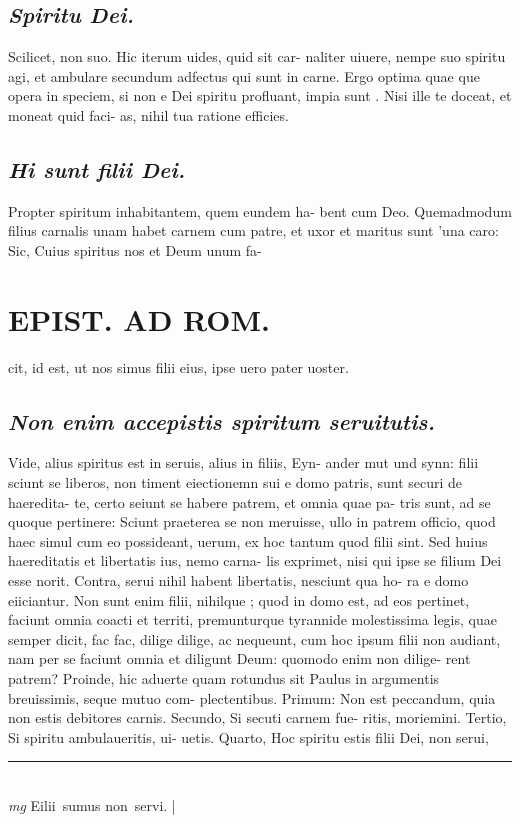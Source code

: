 \documentclass{article}
\begin{document}
\begin{pages}
\subsection*{\textit{Spiritu Dei. }}\pstart Scilicet, non suo. Hic iterum uides, quid sit car- naliter uiuere, nempe suo spiritu agi, et ambulare secundum adfectus qui sunt in carne. Ergo optima quae que opera in speciem, si non e Dei spiritu profluant, impia sunt . Nisi ille te doceat, et moneat quid faci- as, nihil tua ratione efficies.   \pend
{}
{}
\subsection*{\textit{Hi sunt filii Dei. }}\pstart Propter spiritum inhabitantem, quem eundem ha- bent cum Deo. Quemadmodum filius carnalis unam habet carnem cum patre, et uxor et maritus sunt 'una caro: Sic, Cuius spiritus nos et Deum unum fa-  \pend
\section*{EPIST. AD ROM.  }
\marginpar{[ p. ]}\pstart cit, id est, ut nos simus filii eius, ipse uero pater uoster.  \pend
{}
{}
\subsection*{\textit{Non enim accepistis spiritum seruitutis. }}\pstart Vide, alius spiritus est in seruis, alius in filiis, Eyn- ander mut und synn: filii sciunt se liberos, non timent eiectionemn sui e domo patris, sunt securi de haeredita- te, certo seiunt se habere patrem, et omnia quae pa- tris sunt, ad se quoque pertinere: Sciunt praeterea se non meruisse, ullo in patrem officio, quod haec simul cum eo possideant, uerum, ex hoc tantum quod filii sint.  Sed huius haereditatis et libertatis ius, nemo carna- lis exprimet, nisi qui ipse se filium Dei esse norit.  Contra, serui nihil habent libertatis, nesciunt qua ho- ra e domo eiiciantur. Non sunt enim filii, nihilque ; quod in domo est, ad eos pertinet, faciunt omnia coacti et territi, premunturque tyrannide molestissima legis, quae semper dicit, fac fac, dilige dilige, ac nequeunt, cum hoc ipsum filii non audiant, nam per se faciunt omnia et diligunt Deum: quomodo enim non dilige- rent patrem? Proinde, hic aduerte quam rotundus sit Paulus in argumentis breuissimis, seque mutuo com- plectentibus. Primum: Non est peccandum, quia non estis debitores carnis. Secundo, Si secuti carnem fue- ritis, moriemini. Tertio, Si spiritu ambulaueritis, ui- uetis. Quarto, Hoc spiritu estis filii Dei, non serui,  \pend
\vspace{0.5cm}\noindent
\vspace{0.2cm}\rule{1cm}{0.2pt}\\ 
\hspace{0.2cm}\textit{mg}
\footnotesize Eilii sumus non servi. 
\normalsize| 

\end{pages}
\end{document}
